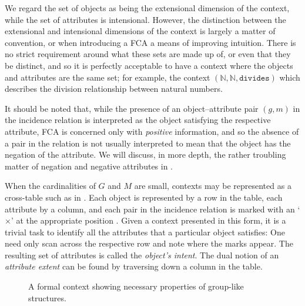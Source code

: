 We regard the set of objects as being the extensional dimension of the context, while the set of attributes is intensional. However, the distinction
between the extensional and intensional dimensions of the context is largely a matter of convention, or when introducing a FCA a means of
improving intuition. There is no strict requirement around what these sets are made up of, or even that they be distinct, and so it is perfectly
acceptable to have a context where the objects and attributes are the same set; for example, the context $(\mathbb{N}, \mathbb{N}, \texttt{divides
})$ which describes the division relationship between natural numbers.

It should be noted that, while the presence of an object--attribute pair $(g,m)$ in the incidence relation is interpreted as the object satisfying
the respective attribute, FCA is concerned only with \textit{positive} information, and so the absence of a pair in the relation is not
usually interpreted to mean that the object has the negation of the attribute. We will discuss, in more depth, the rather troubling matter of
negation and negative attributes in .

When the cardinalities of $G$ and $M$ are small, contexts may be represented as a cross-table such as in . Each object is
represented by a row in the table, each attribute by a column, and each pair in the incidence relation is marked with an `$\times$' at the appropriate
position \cite[pp. 17]{ganter1999formal}. Given a context presented in this form, it is a trivial task to identify all the attributes that a
particular object satisfies: One need only scan across the respective row and note where the marks appear. The resulting set of attributes is
called the \textit{object's intent}. The dual notion of an \textit{attribute extent} can be found by traversing down a column in the table.

\begin{figure}[H]
  \centering
  \small
  \begin{cxt}
    \label{cxt:grouplikes}    
        
        
     
  \end{cxt}
  \caption{A formal context showing necessary properties of group-like structures.}
  \label{context:formal-context-group-structures}
\end{figure}

